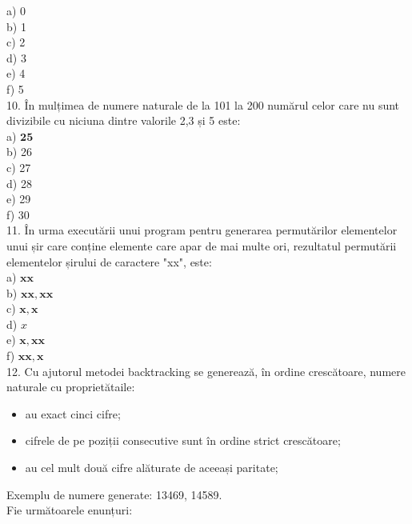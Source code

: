 a) 0\\
b) 1\\
c) 2\\
d) 3\\
e) 4\\
f) 5\\
10. În mulțimea de numere naturale de la 101 la 200 numărul celor care nu sunt divizibile cu niciuna dintre valorile 2,3 și 5 este:\\
a) $\mathbf{2 5}$\\
b) 26\\
c) 27\\
d) 28\\
e) 29\\
f) 30\\
11. În urma executării unui program pentru generarea permutărilor elementelor unui șir care conține elemente care apar de mai multe ori, rezultatul permutării elementelor șirului de caractere "xx", este:\\
a) $\mathbf{x} \mathbf{x}$\\
b) $\mathbf{x x}, \mathbf{x x}$\\
c) $\mathbf{x}, \mathbf{x}$\\
d) $x$\\
e) $\mathbf{x}, \mathbf{x} \mathbf{x}$\\
f) $\mathbf{x x}, \mathbf{x}$\\
12. Cu ajutorul metodei backtracking se generează, în ordine crescătoare, numere naturale cu proprietătaile:

\begin{itemize}
  \item au exact cinci cifre;
  \item cifrele de pe poziții consecutive sunt în ordine strict crescătoare;
  \item au cel mult două cifre alăturate de aceeași paritate;
\end{itemize}

Exemplu de numere generate: 13469, 14589.\\
Fie următoarele enunțuri:

